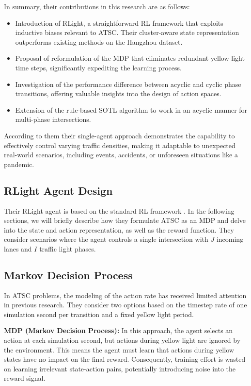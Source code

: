 In summary, their contributions in this research are as follows:
\begin{itemize}
    \item Introduction of RLight, a straightforward RL framework that exploits inductive biases relevant to ATSC. Their cluster-aware state representation outperforms existing methods on the Hangzhou dataset.
    \item Proposal of reformulation of the MDP that eliminates redundant yellow light time steps, significantly expediting the learning process.
    \item Investigation of the performance difference between acyclic and cyclic phase transitions, offering valuable insights into the design of action spaces.
    \item Extension of the rule-based SOTL algorithm to work in an acyclic manner for multi-phase intersections.
\end{itemize}

According to them their single-agent approach demonstrates the capability to effectively control varying traffic densities, making it adaptable to unexpected real-world scenarios, including events, accidents, or unforeseen situations like a pandemic.

\subsection{RLight Agent Design}
\label{sec:rlight_agent_design}

Their RLight agent is based on the standard RL framework \cite{sutton2018reinforcement}. In the following sections, we will briefly describe how they formulate ATSC as an MDP and delve into the state and action representation, as well as the reward function. They consider scenarios where the agent controls a single intersection with \(J\) incoming lanes and \(I\) traffic light phases.

\subsection{Markov Decision Process}
\label{sec:mdp}

In ATSC problems, the modeling of the action rate has received limited attention in previous research. They consider two options based on the timestep rate of one simulation second per transition and a fixed yellow light period.

\textbf{MDP (Markov Decision Process):} In this approach, the agent selects an action at each simulation second, but actions during yellow light are ignored by the environment. This means the agent must learn that actions during yellow states have no impact on the final reward. Consequently, training effort is wasted on learning irrelevant state-action pairs, potentially introducing noise into the reward signal.

